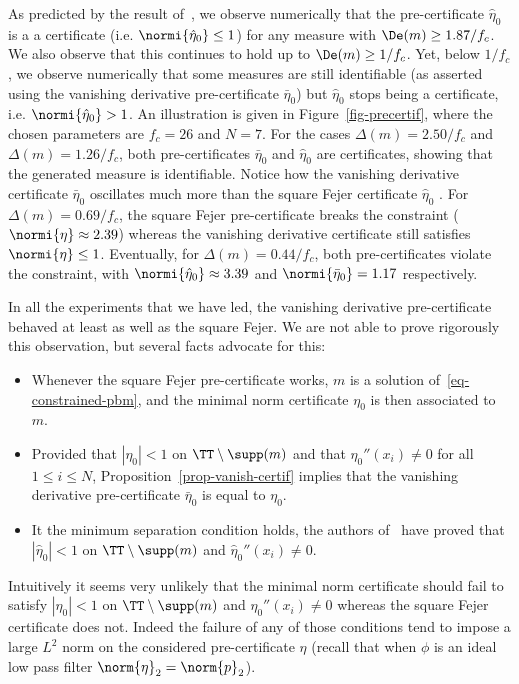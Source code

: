 As predicted by the result of~\cite{Candes-toward}, we observe numerically that the pre-certificate $\hat \eta_0$ is a a certificate (i.e. $\normi{\hat \eta_0} \leq 1$) for any measure with $\De(m) \geq 1.87/f_c$. We also observe that this continues to hold up to $\De(m) \geq 1/f_c$. Yet, below $1/f_c$, we observe numerically that some measures are still identifiable (as asserted using the vanishing derivative pre-certificate $\bar \eta_0$)  but $\hat \eta_0$ stops being a certificate, i.e. $\normi{\hat \eta_0} > 1$. An illustration is given in Figure~\ref{fig-precertif}, where the chosen parameters are $f_c=26$ and $N=7$. For the cases $\Delta(m)=2.50/f_c$ and $\Delta(m)=1.26/f_c$, both pre-certificates $\bar\eta_0$ and $\hat\eta_0$ are certificates, showing that the generated measure is identifiable. Notice how the vanishing derivative certificate $\bar\eta_0$ oscillates much more than the square Fejer certificate $\hat\eta_0$ . For $\Delta(m)=0.69/f_c$, the square Fejer pre-certificate breaks the constraint ($\normi{\eta} \approx 2.39$) whereas the vanishing derivative certificate still satisfies $\normi{\eta} \leq 1$. Eventually, for $\Delta(m)=0.44/f_c$, both pre-certificates violate the constraint, with $\normi{\hat\eta_0} \approx 3.39$ and $\normi{\bar\eta_0}=1.17$ respectively. 
 

In all the experiments that we have led, the vanishing derivative pre-certificate behaved at least as well as the square Fejer. We are not able to prove rigorously this observation, but several facts advocate for this:
\begin{itemize}
 	\item Whenever the square Fejer pre-certificate works, $m$ is a solution of~\eqref{eq-constrained-pbm}, and the minimal norm certificate $\eta_0$
 is then associated to $m$.
 
 	\item Provided that  $|\eta_0| <1$ on $\TT\setminus \supp (m)$ and that $\eta_0''(x_i)\neq 0$
  for all $1\leq i\leq N$, Proposition~\ref{prop-vanish-certif} implies that the
   vanishing derivative pre-certificate $\bar\eta_0$ is equal to $\eta_0$.

	\item It the minimum separation condition holds, the authors of~\cite{Candes-toward} have proved that 
$|\hat \eta_0| <1$ on $\TT\setminus \supp (m)$ and $\hat \eta_0''(x_i)\neq 0$.
\end{itemize}
Intuitively it seems very unlikely that the minimal norm certificate should fail to satisfy $|\eta_0| <1$ on $\TT\setminus \supp (m)$ and $\eta_0''(x_i)\neq 0$ whereas the  square Fejer certificate does not. Indeed the failure of any of those conditions tend to impose a large $L^2$ norm on the considered pre-certificate $\eta$ (recall that when $\phi$ is an ideal low pass filter $\norm{\eta}_2=\norm{p}_2$).
 
 
 
 